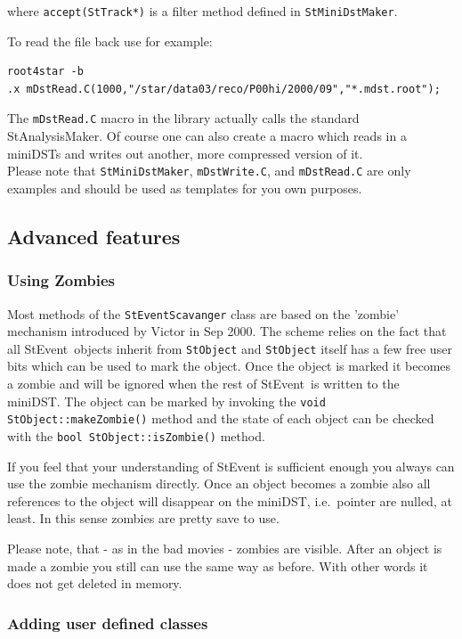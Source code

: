 \documentclass[twoside]{article}
\newcommand{\StEvent}{\textsf{StEvent}}
\begin{document}
where \texttt{accept(StTrack*)} is a filter method defined in \texttt{StMiniDstMaker}.

To read the file back use for example:
\begin{verbatim}
root4star -b
.x mDstRead.C(1000,"/star/data03/reco/P00hi/2000/09","*.mdst.root");
\end{verbatim}

The \texttt{mDstRead.C} macro in the library actually calls the standard StAnalysisMaker.
Of course one can also create a macro which reads in a miniDSTs and writes out
another, more compressed version of it.\\
Please note that \texttt{StMiniDstMaker}, \texttt{mDstWrite.C}, and \texttt{mDstRead.C}
are only examples and should be used as templates for you own purposes.

\subsection{Advanced features}
\subsubsection{Using Zombies}
Most methods of the  \texttt{StEventScavanger} class are based on the 'zombie' mechanism
introduced by Victor in Sep 2000.
The scheme relies on the fact that all \StEvent\ objects inherit from \texttt{StObject}
and \texttt{StObject} itself has a few free user bits which can be used to mark the object.
Once the object is marked it becomes a zombie and will be ignored when the rest of
\StEvent\ is written to the miniDST. The object can be marked by invoking the
\texttt{void StObject::makeZombie()} method and the state of each object can be
checked with the \texttt{bool StObject::isZombie()} method.

If you feel that your understanding of StEvent is sufficient enough you always can use
the zombie mechanism directly. Once an object becomes a zombie also all references to the
object will disappear on the miniDST, i.e.~pointer are nulled, at least. In this sense
zombies are pretty save to use.

Please note, that - as in the bad movies - zombies are visible. After an object is made
a zombie you still can use the same way as before. With other words it does not get deleted
in memory.

\subsubsection{Adding user defined classes}
\end{document}
